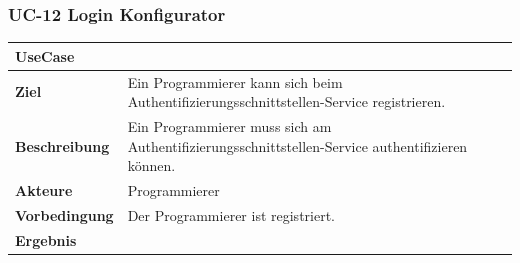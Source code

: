 \subsubsection{UC-12 Login Konfigurator}\label{uc-12-login-konfigurator}

\begin{longtable}[c]{@{}ll@{}}
\toprule
\begin{minipage}[b]{0.34\columnwidth}\raggedright\strut
\textbf{UseCase}
\strut\end{minipage} &
\begin{minipage}[b]{0.60\columnwidth}\raggedright\strut
\strut\end{minipage}\tabularnewline
\midrule
\endhead
\begin{minipage}[t]{0.34\columnwidth}\raggedright\strut
\textbf{Ziel}
\strut\end{minipage} &
\begin{minipage}[t]{0.60\columnwidth}\raggedright\strut
Ein Programmierer kann sich beim
Authentifizierungsschnittstellen-Service registrieren.
\strut\end{minipage}\tabularnewline
\begin{minipage}[t]{0.34\columnwidth}\raggedright\strut
\textbf{Beschreibung}
\strut\end{minipage} &
\begin{minipage}[t]{0.60\columnwidth}\raggedright\strut
Ein Programmierer muss sich am Authentifizierungsschnittstellen-Service
authentifizieren können.
\strut\end{minipage}\tabularnewline
\begin{minipage}[t]{0.34\columnwidth}\raggedright\strut
\textbf{Akteure}
\strut\end{minipage} &
\begin{minipage}[t]{0.60\columnwidth}\raggedright\strut
Programmierer
\strut\end{minipage}\tabularnewline
\begin{minipage}[t]{0.34\columnwidth}\raggedright\strut
\textbf{Vorbedingung}
\strut\end{minipage} &
\begin{minipage}[t]{0.60\columnwidth}\raggedright\strut
Der Programmierer ist registriert.
\strut\end{minipage}\tabularnewline
\begin{minipage}[t]{0.34\columnwidth}\raggedright\strut
\textbf{Ergebnis}
\strut\end{minipage} &
\begin{minipage}[t]{0.60\columnwidth}\raggedright\strut

\end{minipage}
\end{longtable}
